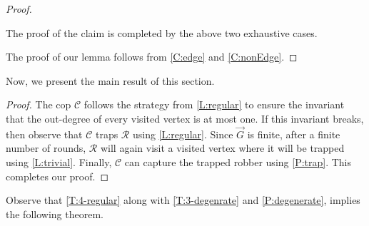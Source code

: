 \documentclass[a4paper,12pt]{amsart}
\newtheorem{theorem}{Theorem}[section]
\newtheorem{lemma}[theorem]{Lemma}
\newcommand{\R}{\mathcal{R}}
\newcommand{\C}{\mathcal{C}}
\newcommand{\csp}[1]{{\sf c_{sp}}(\overrightarrow{#1})}
\newenvironment{proofofclaim}{%
  \renewcommand{\proofname}{Proof of Claim}\proof}{\endproof}
\let\leq\leqslant
\begin{document}
\begin{proof}
\begin{proofofclaim}
\begin{enumerate}
\begin{enumerate}
            
            
            
            
          

            
        \end{enumerate}
        
         
    \end{enumerate}

    The proof of the claim is completed by the above two exhaustive cases.
   \end{proofofclaim}
        
   The proof of our lemma follows from \cref{C:edge} and \cref{C:nonEdge}.    
\end{proof} 

Now, we present the main result of this section.
\Tregular*
\begin{proof}
    The cop $\C$ follows the strategy from \cref{L:regular} to ensure  the invariant that the out-degree of every visited vertex is at most one. If this invariant breaks, then observe that $\C$ traps $\R$ using \cref{L:regular}. Since $\overrightarrow{G}$ is finite, after a finite number of rounds, $\R$ will again visit a visited vertex where it will be trapped using \cref{L:trivial}. Finally, $\C$ can capture the trapped robber using \cref{P:trap}. This completes our proof.
    \end{proof}

Observe that \cref{T:4-regular} along with \cref{T:3-degenrate} and \cref{P:degenerate},  implies the following theorem.

\Tmaxdegree*
\end{document}
